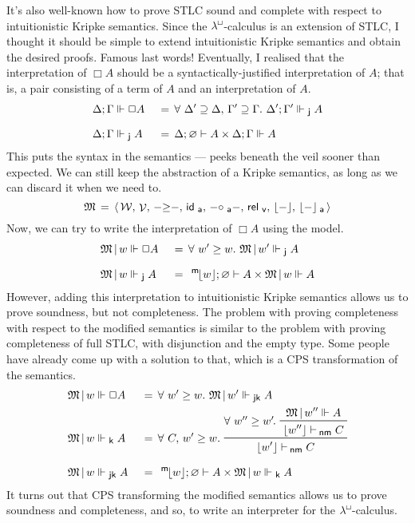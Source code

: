 \documentclass{entcs}
\numberwithin{equation}{thm}
\newcommand{\lambdabox}{\lambda^{\mkern-1mu\sq\mkern-2mu}}
\newcommand{\binop}[1]{-\mathord{#1}-}
\newcommand{\tsf}[1]{\textsf{\upshape{#1}}}
\newcommand{\stsf}[1]{\smash{\tsf{\small{#1}}}}
\renewcommand{\:}{\mathrel{:}}
\let\oldforall\forall
\renewcommand{\forall}{\oldforall\,}
\newcommand{\0}{\varnothing}
\renewcommand{\geq}{\mathrel{\supseteq}}
\newcommand{\sq}{\Box}
\renewcommand{\e}{\mathrel{\vdash}}
\newcommand{\enm}{\mathrel{\vdash_{\mkern-2mu\stsf{nm}}}}
\newcommand{\M}{\mathfrak{M}}
\newcommand{\Mover}{\M\,|\,}
\newcommand{\W}{\mathcal{W}}
\newcommand{\V}{\operatorname{\mathcal{V}}}
\newcommand{\ida}{\operatorname{\tsf{id}_{\stsf{a}}}}
\newcommand{\compa}{\mathrel{\circ_{\stsf{a}}}}
\newcommand{\relv}{\operatorname{\tsf{rel}_{\stsf{v}}}}
\newcommand{\peek}[1]{\mathopen{\lfloor}{#1}\mathclose{\rfloor}}
\newcommand{\peeka}[1]{\mathopen{\lfloor}{#1}\mathclose{\rfloor_{\mkern-2mu\stsf{a}}}}
\newcommand{\mpeek}[1]{\mathopen{^{\stsf{m}\mkern-3mu}\lfloor}{#1}\mathclose{\rfloor}}
\newcommand{\ee}{\mathrel{\Vdash}}
\newcommand{\eek}{\mathrel{\Vdash_{\stsf{k}}}}
\newcommand{\eej}{\mathrel{\Vdash_{\stsf{j}}}}
\newcommand{\eejk}{\mathrel{\Vdash_{\stsf{jk}}}}
\begin{document}
It's also well-known how to prove STLC sound and complete with respect to intuitionistic Kripke semantics.
Since the $\lambdabox$-calculus is an extension of STLC, I thought it should be simple to extend intuitionistic Kripke semantics and obtain the desired proofs.
Famous last words!
Eventually, I realised that the interpretation of $\sq A$ should be a syntactically-justified interpretation of $A$; that is, a pair consisting of a term of $A$ and an interpretation of $A$.
\begin{alignat*}{2}
  & \Delta; \Gamma \ee \sq A \,&&=\, \forall \Delta' \geq \Delta,\,\Gamma' \geq \Gamma.\ \Delta'; \Gamma' \eej A\\[0.5\baselineskip]
  & \Delta; \Gamma \eej A    \,&&=\, \Delta; \0 \e A \times \Delta; \Gamma \ee A
\end{alignat*}
This puts the syntax in the semantics --- peeks beneath the veil sooner than expected.
We can still keep the abstraction of a Kripke semantics, as long as we can discard it when we need to.
  \[\M \,=\, \langle\,\W,\,\V,\,\binop{\ge},\,\ida,\,\binop{\compa},\,\relv,\,\peek{-},\,\peeka{-}\,\rangle\]
Now, we can try to write the interpretation of $\sq A$ using the model.
\begin{alignat*}{2}
  & \Mover w \ee \sq A \,&&=\, \forall w' \ge w.\ \Mover w' \eej A\\[0.5\baselineskip]
  & \Mover w \eej A    \,&&=\, \mpeek{w}; \0 \e A \times \Mover w \ee A
\end{alignat*}
However, adding this interpretation to intuitionistic Kripke semantics allows us to prove soundness, but not completeness.
The problem with proving completeness with respect to the modified semantics is similar to the problem with proving completeness of full STLC, with disjunction and the empty type.
Some people have already come up with a solution to that, which is a CPS transformation of the semantics.
\begin{alignat*}{2}
  & \Mover w \ee \sq A \,&&=\, \forall w' \ge w.\ \Mover w' \eejk A\\
  & \Mover w \eek A    \,&&=\, \forall C,\,w' \ge w.\ \raisebox{-8pt}{\prftree{\raisebox{8pt}{$\forall w'' \ge w'\mkern-2mu.\ $}\prftree{\Mover w'' \ee A}{\lfloor w'' \rfloor \enm C}}{\lfloor w' \rfloor \enm C}}\\[0.5\baselineskip]
  & \Mover w \eejk A \,&&=\, \mpeek{w}; \0 \e A \times \Mover w \eek A
\end{alignat*}
It turns out that CPS transforming the modified semantics allows us to prove soundness and completeness, and so, to write an interpreter for the $\lambdabox$-calculus.
\end{document}
